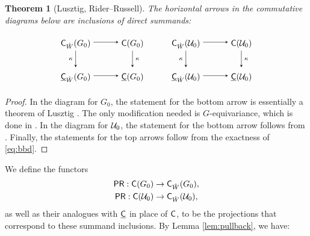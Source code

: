 \documentclass[a4paper,10pt,leqno]{amsart}
\theoremstyle{plain}
\theoremstyle{plain}
\newtheorem{thm}{Theorem}[subsection]
\theoremstyle{plain}
\theoremstyle{definition}
\theoremstyle{remark}
\begin{document}
\begin{thm}[Lusztig, Rider--Russell]\label{thm:summand}
The horizontal arrows in the commutative diagrams below are inclusions of direct summands:
\begin{equation}
\begin{tikzpicture}[baseline=(current bounding box.center), >=stealth]
\matrix(m)[matrix of math nodes, row sep=2em, column sep=3em, text height=2.5ex, text depth=0.5ex]
{	\sf{C}_{\hat{W}}(G_0)
		&\sf{C}(G_0)\\
	\underline{\sf{C}}_{\hat{W}}(G_0)
		&\underline{\sf{C}}(G_0)\\
		};
\path[->,font=\scriptsize, auto]
(m-1-1)		edge (m-1-2)
(m-1-1)		edge node[left]{$\kappa$} (m-2-1)
(m-1-2)		edge node{$\kappa$} (m-2-2)
(m-2-1)		edge (m-2-2);
\end{tikzpicture}
\qquad
\begin{tikzpicture}[baseline=(current bounding box.center), >=stealth]
\matrix(m)[matrix of math nodes, row sep=2em, column sep=3em, text height=2.5ex, text depth=0.5ex]
{	\sf{C}_{\hat{W}}(\cal{U}_0)
		&\sf{C}(\cal{U}_0)\\
	\underline{\sf{C}}_{\hat{W}}(\cal{U}_0)
		&\underline{\sf{C}}(\cal{U}_0)\\
		};
\path[->,font=\scriptsize, auto]
(m-1-1)		edge (m-1-2)
(m-1-1)		edge node[left]{$\kappa$} (m-2-1)
(m-1-2)		edge node{$\kappa$} (m-2-2)
(m-2-1)		edge (m-2-2);
\end{tikzpicture}
\end{equation}
\end{thm}

\begin{proof}
In the diagram for $G_0$, the statement for the bottom arrow is essentially a theorem of Lusztig \cite[Prop.\ 7.2]{lusztig_1985_2}.
The only modification needed is $G$-equivariance, which is done in \cite[Prop.\ 8]{ww_2008}.
In the diagram for $\cal{U}_0$, the statement for the bottom arrow follows from \cite[Thm.\ 3.5]{rr}.
Finally, the statements for the top arrows follow from the exactness of \eqref{eq:bbd}.
\end{proof}

We define the functors
\begin{align}
\sf{PR} : \sf{C}(G_0) &\to \sf{C}_{\hat{W}}(G_0),\\
\sf{PR} : \sf{C}(\cal{U}_0) &\to \sf{C}_{\hat{W}}(\cal{U}_0),
\end{align}
as well as their analogues with $\underline{\sf{C}}$ in place of $\sf{C}$, to be the projections that correspond to these summand inclusions.
By Lemma \ref{lem:pullback}, we have:
\end{document}
